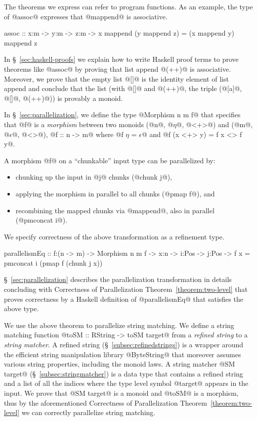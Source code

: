 The theorems we express can refer to program functions.
As an example, the type of @assoc@ expresses that @mappend@
is associative.
%
\begin{code}
  assoc :: x:m -> y:m -> z:m -> {x mappend (y mappend z) = (x mappend y) mappend z}
\end{code}
%
In \S~\ref{sec:haskell-proofs} we explain
how to write Haskell proof terms to prove theorems like @assoc@
by proving that list append @(++)@ is associative.
%
Moreover, we prove that the empty list @[]@ is the identity element of
list append and conclude that the list
(with @[]@ and @(++)@, \ie the triple (@[a]@, @[]@, @(++)@))
is provably a monoid.

In \S~\ref{sec:parallelization}, we define the type @Morphism n m f@ that specifies
that @f@ is a \textit{morphism} between two monoids
(@n@, @$\eta$@, @<+>@) and (@m@, @$\epsilon$@, @<>@),
\ie @f :: n -> m@ where @f $\eta$ = $\epsilon$@ and @f (x <+> y) = f x <> f y@.

A morphism @f@ on a ``chunkable'' input type can be parallelized by:
\begin{itemize}
  \item chunking up the input in @j@ chunks (@chunk j@),
  \item applying the morphism in parallel to all chunks (@pmap f@), and
  \item recombining the mapped chunks via @mappend@, also in parallel (@pmconcat i@).
\end{itemize}
%
We specify correctness of the above transformation as a refinement type.
%
\begin{code}
  parallelismEq
    :: f:(n -> m) -> Morphism n m f -> x:n -> i:Pos -> j:Pos
    -> {f x = pmconcat i (pmap f (chunk j x))}
\end{code}
%
\S~\ref{sec:parallelization} describes the parallelization transformation in details
concluding with 
Correctness of Parallelization Theorem~\ref{theorem:two-level} 
that proves correctness by a Haskell definition of @parallelismEq@ 
that satisfies the above type.

We use the above theorem to parallelize string matching.
We define a string matching function @toSM :: RString -> toSM target@
from a \textit{refined string} to a \textit{string matcher}.
%
A refined string (\S~\ref{subsec:refinedstrings}) is a wrapper around
the efficient string manipulation library
@ByteString@ that moreover assumes
various string properties, including the monoid laws.
%
A string matcher @SM target@ (\S~\ref{subsec:stringmatcher}) is a data type that contains
a refined string and a list of all the indices
where the type level symbol @target@ appears in the input.
%
We prove that @SM target@ is a monoid and @toSM@ is a morphism,
thus by the aforementioned Correctness of Parallelization Theorem~\ref{theorem:two-level}
we can correctly parallelize string matching.


